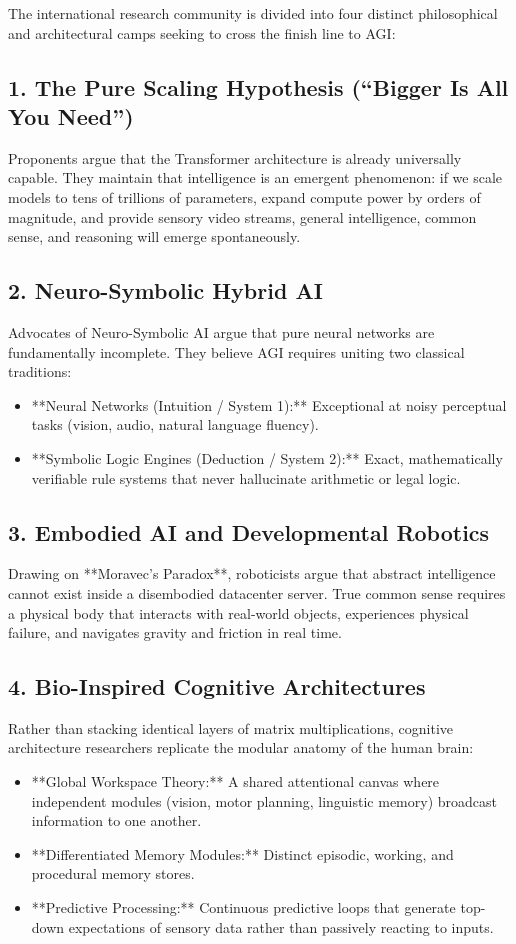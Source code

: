 \documentclass[11pt,journal,onecolumn]{IEEEtran}
\begin{document}
The international research community is divided into four distinct philosophical and architectural camps seeking to cross the finish line to AGI:

\subsection{1. The Pure Scaling Hypothesis (``Bigger Is All You Need'')}
Proponents argue that the Transformer architecture is already universally capable. They maintain that intelligence is an emergent phenomenon: if we scale models to tens of trillions of parameters, expand compute power by orders of magnitude, and provide sensory video streams, general intelligence, common sense, and reasoning will emerge spontaneously.

\subsection{2. Neuro-Symbolic Hybrid AI}
Advocates of Neuro-Symbolic AI argue that pure neural networks are fundamentally incomplete. They believe AGI requires uniting two classical traditions:
\begin{itemize}
    \item **Neural Networks (Intuition / System 1):** Exceptional at noisy perceptual tasks (vision, audio, natural language fluency).
    \item **Symbolic Logic Engines (Deduction / System 2):** Exact, mathematically verifiable rule systems that never hallucinate arithmetic or legal logic.
\end{itemize}

\subsection{3. Embodied AI and Developmental Robotics}
Drawing on **Moravec's Paradox**, roboticists argue that abstract intelligence cannot exist inside a disembodied datacenter server. True common sense requires a physical body that interacts with real-world objects, experiences physical failure, and navigates gravity and friction in real time.

\subsection{4. Bio-Inspired Cognitive Architectures}
Rather than stacking identical layers of matrix multiplications, cognitive architecture researchers replicate the modular anatomy of the human brain:
\begin{itemize}
    \item **Global Workspace Theory:** A shared attentional canvas where independent modules (vision, motor planning, linguistic memory) broadcast information to one another.
    \item **Differentiated Memory Modules:** Distinct episodic, working, and procedural memory stores.
    \item **Predictive Processing:** Continuous predictive loops that generate top-down expectations of sensory data rather than passively reacting to inputs.
\end{itemize}
\end{document}
